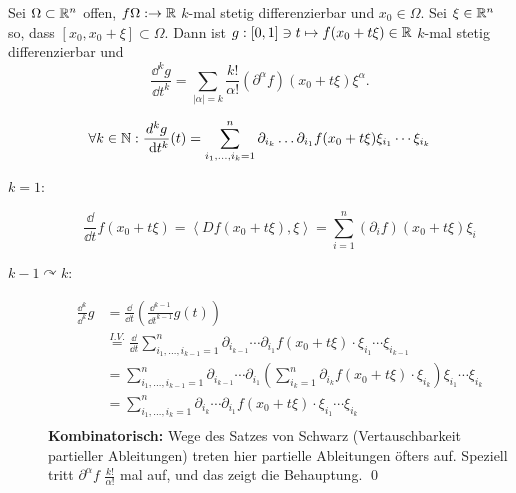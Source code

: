 \begin{theorem}
	Sei $ \Omega \subset \mathbb{R} ^n $ offen, $ f \Omega: \to \mathbb{R}  $ $ k $-mal stetig differenzierbar und $ x_0 \in \Omega $.
	Sei $ \xi \in \mathbb{R} ^n $ so, dass $ [x_0 , x_0 + \xi] \subset \Omega $.
	Dann ist $ g:[0, 1] \ni t \mapsto f(x_0 + t\xi) \in \mathbb{R}  $ $ k $-mal stetig differenzierbar und
	\[
		\frac{ \dd ^k g }{ \dd t^k } = \sum_{\left| \alpha \right| = k}^{} \frac{ k! }{ \alpha! } \left( \partial^{\alpha} f \right) (x_0 + t\xi) \xi^{\alpha} .
	\]
\end{theorem}
\begin{proof*}
	\[
		\forall k \in \mathbb{N} : \frac{ d^{k} g }{ ~\text{d} t^k } (t) = \sum_{i_1, \dotsc, i_k=1}^{n} \partial_{i_k} \dotsc \partial_{i_1} f(x_0 + t\xi) \xi_{i_1} \dotsb \xi_{i_k} 
	\]
	\begin{description}
		\item[$ k = 1 $:] 
			\[
				\frac{ \dd }{ \dd t } f(x_0 + t\xi) = \left< Df(x_0 + t\xi), \xi \right> = \sum_{i=1}^{n} \left( \partial_i f \right) \left( x_0 + t\xi \right) \xi_i
			\]
		\item[$ k - 1 \curvearrowright k $:]
			\begin{align*}
				\frac{ \dd ^k }{ \dd ^k } g &= \frac{ \dd }{ \dd t } \left( \frac{ \dd ^{k - 1} }{ \dd t^{k - 1}  } g(t) \right) \\
				~ & \overset{I.V.}{=} \frac{ \dd }{ \dd t } \sum_{i_1, \dotsc, i_{k - 1} =1}^{n} \partial_{i_{k - 1} } \dotsb \partial_{i_1} f\left( x_0 + t\xi \right) \cdot \xi_{i_1} \dotsb \xi_{i_{k - 1} } \\
				~ & = \sum_{i_1, \dotsc, i_{k - 1} =1}^{n} \partial_{i_{k - 1} } \dotsb \partial_{i_1} \left( \sum_{i_k=1}^{n} \partial_{i_k} f(x_0 + t\xi) \cdot \xi_{i_k}  \right) \xi_{i_1} \dotsb \xi_{i_k} \\
				~ &= \sum_{i_1, \dotsc, i_k=1}^{n} \partial_{i_k} \dotsb \partial_{i_1} f(x_0 + t\xi) \cdot \xi_{i_1} \dotsb \xi_{i_k}  \\
			\end{align*}
			\textbf{Kombinatorisch:} Wege des Satzes von Schwarz (Vertauschbarkeit partieller Ableitungen) treten hier partielle Ableitungen öfters auf.
			Speziell tritt $ \partial^{\alpha} f $ $ \frac{k!}{ \alpha! }  $ mal auf, und das zeigt die Behauptung. \qed
	\end{description}
\end{proof*}

